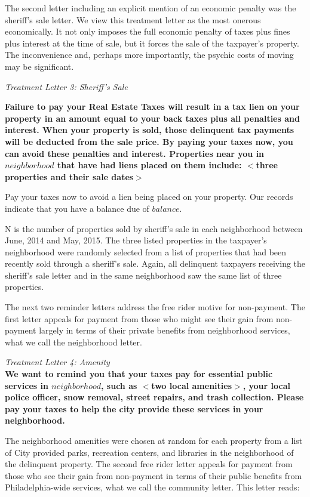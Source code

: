 \documentclass[12pt]{article}
\begin{document}
The second letter including an explicit mention of an economic penalty
was the sheriff's sale letter.  We view this treatment letter as the
most onerous economically.  It not only imposes the full economic
penalty of taxes plus fines plus interest at the time of sale, but it
forces the sale of the taxpayer's property.  The inconvenience and,
perhaps more importantly, the psychic costs of moving may be
significant.  
	
{\it Treatment Letter 3: Sheriff's Sale} \\ {\bf Failure to pay your Real Estate Taxes will result in a tax
  lien on your property in an amount equal to your back taxes plus all
  penalties and interest. When your property is sold, those delinquent
  tax payments will be deducted from the sale price. By paying your
  taxes now, you can avoid these penalties and interest. Properties
  near you in $neighborhood$ that have had liens placed on them
  include: $<$three properties and their sale dates$>$

  Pay your taxes now to avoid a lien being placed on your property.
  Our records indicate that you have a balance due of $balance$.}
	
N is the number of properties sold by sheriff's sale in each
neighborhood between June, 2014 and May, 2015.  The three listed
properties in the taxpayer's neighborhood were randomly selected from
a list of properties that had been recently sold through a sheriff's
sale.  Again, all delinquent taxpayers receiving the sheriff's sale
letter and in the same neighborhood saw the same list of three
properties.

The next two reminder letters address the free rider motive for
non-payment.  The first letter appeals for payment from those who
might see their gain from non-payment largely in terms of their
private benefits from neighborhood services, what we call the
neighborhood letter.  

{\it Treatment Letter 4: Amenity } \\ {\bf We want to remind you that your taxes pay for essential
  public services in $neighborhood$, such as $<$two local
  amenities$>$, your local police officer, snow removal, street
  repairs, and trash collection. Please pay your taxes to help the
  city provide these services in your neighborhood.}

The neighborhood amenities were chosen at random for each property
from a list of City provided parks, recreation centers, and libraries
in the neighborhood of the delinquent property.  The second free rider
letter appeals for payment from those who see their gain from
non-payment in terms of their public benefits from Philadelphia-wide
services, what we call the community letter.  This letter reads:
\end{document}

